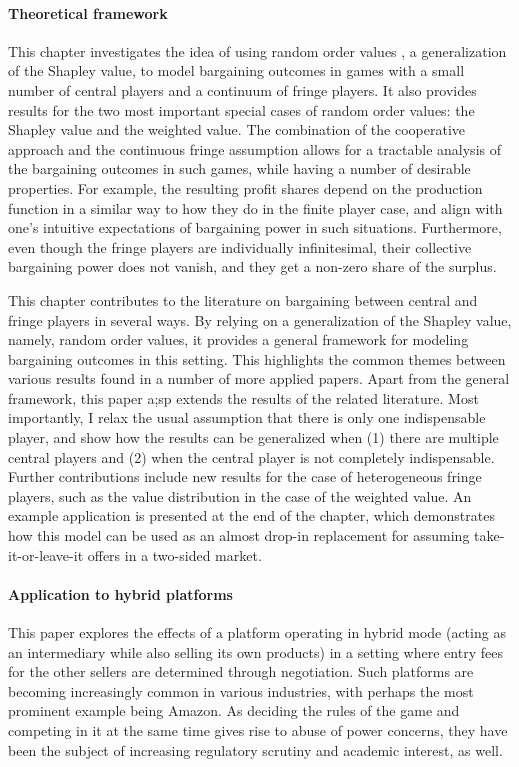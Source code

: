\paragraph{Theoretical framework}
This chapter investigates the idea of using random order values \parencite{weber1988probabilistic}, a generalization of the Shapley value, to model bargaining outcomes in games with a small number of central players and a continuum of fringe players.
It also provides results for the two most important special cases of random order values: the Shapley value and the weighted value.
The combination of the cooperative approach and the continuous fringe assumption allows for a tractable analysis of the bargaining outcomes in such games, while having a number of desirable properties.
For example, the resulting profit shares depend on the production function in a similar way to how they do in the finite player case, and align with one's intuitive expectations of bargaining power in such situations.
Furthermore, even though the fringe players are individually infinitesimal, their collective bargaining power does not vanish, and they get a non-zero share of the surplus.


This chapter contributes to the literature on bargaining between central and fringe players in several ways.
By relying on a generalization of the Shapley value, namely, random order values, it provides a general framework for modeling bargaining outcomes in this setting.
This highlights the common themes between various results found in a number of more applied papers.
Apart from the general framework, this paper a;sp extends the results of the related literature.
Most importantly, I relax the usual assumption that there is only one indispensable player, and show how the results can be generalized when (1) there are multiple central players and (2) when the central player is not completely indispensable.
Further contributions include new results for the case of heterogeneous fringe players, such as the value distribution in the case of the weighted value.
An example application is presented at the end of the chapter, which demonstrates how this model can be used as an almost drop-in replacement for assuming take-it-or-leave-it offers in a two-sided market.

\paragraph{Application to hybrid platforms}
This paper explores the effects of a platform operating in hybrid mode (acting as an intermediary while also selling its own products) in a setting where entry fees for the other sellers are determined through negotiation.
Such platforms are becoming increasingly common in various industries, with perhaps the most prominent example being Amazon.
As deciding the rules of the game and competing in it at the same time gives rise to abuse of power concerns, they have been the subject of increasing regulatory scrutiny and academic interest, as well.

